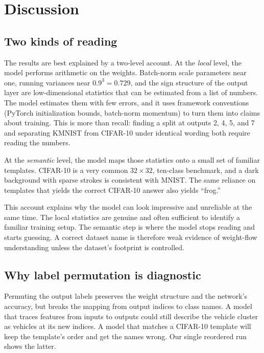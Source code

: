 \documentclass[11pt]{article}
\begin{document}
\section{Discussion}

\subsection{Two kinds of reading}

The results are best explained by a two-level account. At the \emph{local} level, the model performs arithmetic on the weights. Batch-norm scale parameters near one, running variances near $0.9^3=0.729$, and the sign structure of the output layer are low-dimensional statistics that can be estimated from a list of numbers. The model estimates them with few errors, and it uses framework conventions (PyTorch initialization bounds, batch-norm momentum) to turn them into claims about training. This is more than recall: finding a split at outputs 2, 4, 5, and 7 and separating KMNIST from CIFAR-10 under identical wording both require reading the numbers.

At the \emph{semantic} level, the model maps those statistics onto a small set of familiar templates. CIFAR-10 is a very common $32\times32$, ten-class benchmark, and a dark background with sparse strokes is consistent with MNIST. The same reliance on templates that yields the correct CIFAR-10 answer also yields ``frog.''

This account explains why the model can look impressive and unreliable at the same time. The local statistics are genuine and often sufficient to identify a familiar training setup. The semantic step is where the model stops reading and starts guessing. A correct dataset name is therefore weak evidence of weight-flow understanding unless the dataset's footprint is controlled.

\subsection{Why label permutation is diagnostic}

Permuting the output labels preserves the weight structure and the network's accuracy, but breaks the mapping from output indices to class names. A model that traces features from inputs to outputs could still describe the vehicle cluster as vehicles at its new indices. A model that matches a CIFAR-10 template will keep the template's order and get the names wrong. Our single reordered run shows the latter.
\end{document}
